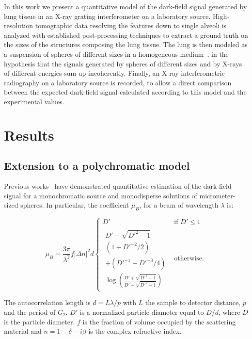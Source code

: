 \documentclass[preprint,12pt]{elsarticle}
\begin{document}
In this work we present a quantitative model of the dark-field signal
generated by lung tissue in an X-ray grating interferometer on a laboratory
source. High-resolution tomographic data resolving the features down to single
alveoli is analyzed with established post-processing techniques to extract a
ground truth on the sizes of the structures composing the lung tissue. The
lung is then modeled as a suspension of spheres of different sizes in a
homogeneous medium~\cite{Kitchen2004, Carnibella2012a, Leong2014}, in the hypothesis that the signals generated by spheres
of different sizes and by X-rays of different energies sum up incoherently.
Finally, an X-ray interferometric radiography on a laboratory source is
recorded, to allow a direct comparison between the expected dark-field
signal calculated according to this model and the experimental values.

\section*{Results}\label{sec:model}
\subsection*{Extension to a polychromatic model}
Previous works~\cite{Lynch:11,Gkoumas2016} have demonstrated quantitative estimation of
the dark-field signal for a monochromatic source and monodisperse solutions
of micrometer-sized spheres. In particular, the coefficient $\mu_B$, for a
beam of wavelength $\lambda$ is:

\begin{equation}
\mu_B = \frac{3\pi}{\lambda^2}f |\Delta n|^2 d
    \begin{cases}
    D' & \text{if } D' \leqslant 1\\
    \begin{aligned}
    D' - \sqrt{D'^2 - 1}\\
    (1 + D'^{-2}/2) \\
    + (D'^{-1} + D'^{-3} / 4) \\
    \log\left(\frac{D' + \sqrt{D'^2 - 1}}{D' - \sqrt{D'^2 - 1}}\right)
    \end{aligned} & \text{otherwise.}
    \end{cases}
    \label{eqn:lynch}
\end{equation}

The autocorrelation length is $d = L\lambda / p$ with $L$ the sample to
detector distance, $p$ and the period of $G_2$. $D'$ is a normalized
particle diameter equal to $D/d$, where $D$ is the particle diameter. $f$ is
the fraction of volume occupied by the scattering material and $n = 1 -
\delta - i\beta$ is the complex refractive index.
\end{document}
